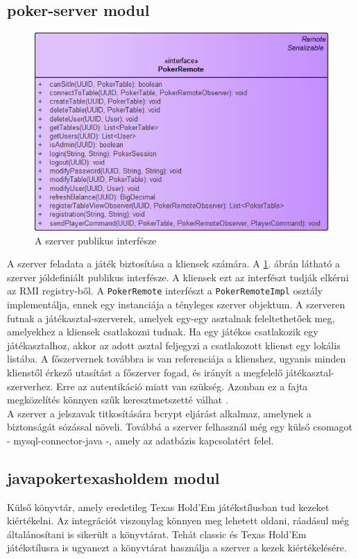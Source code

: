 \subsection{poker-server modul}
\begin{figure}[h!]
  \caption{A szerver publikus interfésze}
  \label{fig:server_public}
  \centering
    \includegraphics[width=\textwidth]{developer-documentation/images/server_remote.png}
\end{figure}
A szerver feladata a játék biztosítása a kliensek számára. A \ref{fig:server_public}. ábrán látható a szerver jóldefiniált publikus interfésze. A kliensek ezt az interfészt tudják elkérni az RMI registry-ből. A \texttt{PokerRemote} interfészt a \texttt{PokerRemoteImpl} osztály implementálja, ennek egy instanciája a tényleges szerver objektum. A szerveren futnak a játékasztal-szerverek, amelyek egy-egy asztalnak feleltethetőek meg, amelyekhez a kliensek csatlakozni tudnak. Ha egy játékos csatlakozik egy játékasztalhoz, akkor az adott asztal feljegyzi a csatlakozott klienst egy lokális listába. A főszervernek továbbra is van referenciája a klienshez, ugyanis minden klienstől érkező utasítást a főszerver fogad, és irányít a megfelelő játékasztal-szerverhez. Erre az autentikáció miatt van szükség. Azonban ez a fajta megközelítés könnyen szűk keresztmetszetté válhat \cite{bottleneck}. \\
A szerver a jelszavak titkosítására bcrypt \cite{bcrypt} eljárást alkalmaz, amelynek a biztonságát sózással növeli. Továbbá a szerver felhasznál még egy külső csomagot - mysql-connector-java -, amely az adatbázis kapcsolatért felel.

\subsection{javapokertexasholdem modul}
Külső könyvtár, amely eredetileg Texas Hold'Em játékstílusban tud kezeket kiértékelni. Az integrációt viszonylag könnyen meg lehetett oldani, ráadásul még általánosítani is sikerült a könyvtárat. Tehát classic és Texas Hold'Em játékstílusra is ugyanezt a könyvtárat használja a szerver a kezek kiértékelésére.

